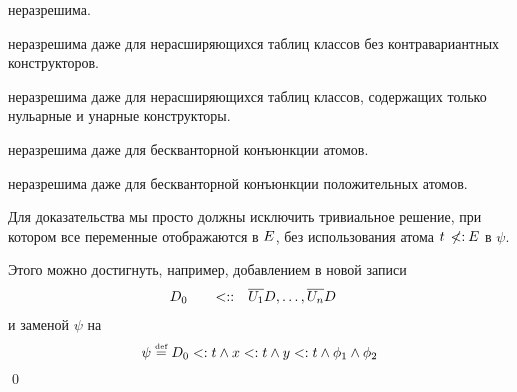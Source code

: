 \begin{crlr}
\subtypesat{} неразрешима.
\end{crlr}

\begin{crlr}
\subtypesat{} неразрешима даже для нерасширяющихся таблиц классов без контравариантных конструкторов.
\end{crlr}

\begin{crlr}
\subtypesat{} неразрешима даже для нерасширяющихся таблиц классов, содержащих только нульарные и унарные конструкторы.
\end{crlr}

\begin{crlr}
\subtypesat{} неразрешима даже для бескванторной конъюнкции атомов.
\end{crlr}

\begin{crlr}
\subtypesat{} неразрешима даже для бескванторной конъюнкции положительных атомов.
\end{crlr}
\begin{proof*}
Для доказательства мы просто должны исключить тривиальное решение, при котором все переменные отображаются в ${E}{}$, без использования атома $t \:\not\!\!{<:}\: {E}$ в $\psi$.

Этого можно достигнуть, например, добавлением в \pcpctid{} новой записи
\begin{alignat*}{3}
    &D_0 \quad &<::& \quad \overline{{U}_{1}}D,\ldots, \overline{{U}_{n}}D
\end{alignat*}
и заменой $\psi$ на
\[
    \psi \mathrel{\stackrel{\mbox{\normalfont\tiny def}}{=}} D_0 <: t \land x <: t \land y <: t \land \phi_{1} \land \phi_{2}
\]
\qed\end{proof*}
